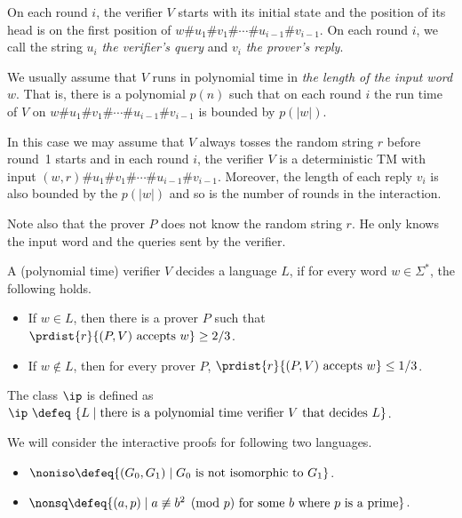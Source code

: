 \documentclass[11pt, a4paper]{article}
\begin{document}
On each round $i$, the verifier $V$ starts with its initial state
and the position of its head is on the first position of $w\# u_1 \# v_1 \#\cdots  \#  u_{i-1}\# v_{i-1}$.
On each round $i$, we call the string $u_i$ {\em the verifier's query} 
and $v_i$ {\em the prover's reply}.

\begin{remark}
We usually assume that $V$ runs in polynomial time in {\em the length of the input word $w$}.
That is, there is a polynomial $p(n)$ such that on each round $i$
the run time of $V$ on $w\# u_1 \# v_1 \#\cdots  \#  u_{i-1}\# v_{i-1}$
is bounded by $p(|w|)$.

In this case we may assume that $V$ always tosses the random string $r$ before round~1 starts
and in each round $i$, the verifier $V$ is a deterministic TM with input 
$(w,r)\# u_1 \# v_1 \#\cdots  \#  u_{i-1}\# v_{i-1}$.
Moreover, the length of each reply $v_i$ is also bounded by the $p(|w|)$
and so is the number of rounds in the interaction.  

Note also that the prover $P$ does not know the random string $r$.
He only knows the input word and the queries sent by the verifier. 
\end{remark}

\begin{definition}
\label{def:verifier-decide}
A (polynomial time) verifier $V$ decides a language $L$,
if for every word $w\in \Sigma^*$, the following holds.
\begin{itemize}
\item
If $w\in L$, then there is a prover $P$ such that $\prdist {r} {(P,V)\ \text{accepts}\ w} \geq 2/3$.
\item
If $w\notin L$, then for every prover $P$, $\prdist {r} {(P,V)\ \text{accepts}\ w} \leq 1/3$.
\end{itemize}
The class $\ip$ is defined as
$\ip \ \defeq \ \{L \mid \text{there is a polynomial time verifier}\ V \ \text{that decides}\ L\}$.
\end{definition}



\begin{example}
We will consider the interactive proofs for following two languages.
\begin{itemize}
\item
$\noniso \defeq \{ (G_0,G_1) \mid \text{$G_0$ is not isomorphic to $G_1$}\}$.
\item
$\nonsq \defeq \{ (a,p) \mid a \not\equiv b^2 \pmod p\ \text{for some $b$ where $p$ is a prime}\}$.
\end{itemize}
\end{example}
\end{document}

